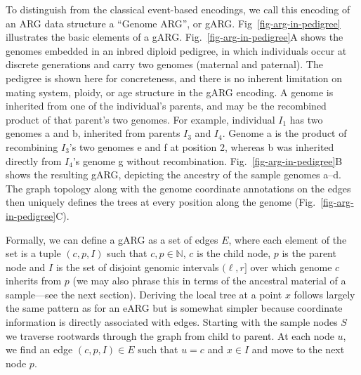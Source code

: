 \documentclass{article}
\begin{document}
To distinguish from the classical event-based encodings,
we call this encoding of an ARG data
structure a ``Genome ARG'', or gARG.
Fig~\ref{fig-arg-in-pedigree} illustrates the basic elements of a gARG.
Fig.~\ref{fig-arg-in-pedigree}A shows the genomes
embedded in an inbred diploid pedigree, in which individuals occur at
discrete generations and carry two genomes (maternal and paternal).
The pedigree is shown here for concreteness, and
there is no inherent limitation on mating system, ploidy, or age structure
in the gARG encoding.
A genome is inherited from one of the individual's parents,
and may be the recombined product of that parent's two genomes.
For example, individual $I_1$ has two genomes \textsf{a} and \textsf{b},
inherited from parents $I_3$ and $I_4$. Genome \textsf{a} is the product of
recombining $I_3$'s two genomes \textsf{e} and \textsf{f} at position 2,
whereas \textsf{b} was inherited directly from $I_4$'s genome \textsf{g} without
recombination. Fig.~\ref{fig-arg-in-pedigree}B shows the resulting gARG,
depicting the ancestry of the sample genomes \textsf{a}--\textsf{d}. The graph
topology along with the genome coordinate annotations on the
edges then uniquely defines the trees at every position
along the genome (Fig.~\ref{fig-arg-in-pedigree}C).

Formally, we can define a gARG as a set of edges $E$, where each
element of the set is a tuple $(c, p, I)$ such that $c, p \in \mathbb{N}$,
$c$ is the child node, $p$ is the parent node and $I$ is the set of
disjoint genomic intervals $(\ell, r]$ over which genome $c$ inherits from $p$ (we may
also phrase this in terms of the ancestral material of a sample---see
the next section). Deriving the local tree at a point $x$
follows largely the same pattern as for an eARG but is somewhat
simpler because coordinate information is directly associated with
edges. Starting with the sample nodes $S$ we traverse
rootwards through the graph from child to parent. At each node $u$, we find an
edge $(c, p, I) \in E$ such that $u = c$ and $x \in I$
and move to the next node $p$.
\end{document}
